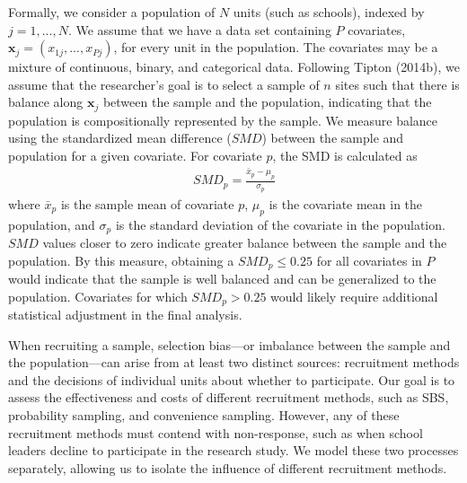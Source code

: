 \documentclass[
  english,
  man,floatsintext]{apa6}
\begin{document}
Formally, we consider a population of \(N\) units (such as schools), indexed by \(j = 1,...,N\).
We assume that we have a data set containing \(P\) covariates, \(\mathbf{x}_j = \left(x_{1j},...,x_{Pj}\right)\), for every unit in the population. The covariates may be a mixture of continuous, binary, and categorical data.
Following Tipton (2014b), we assume that the researcher's goal is to select a sample of \(n\) sites such that there is balance along \(\mathbf{x}_j\) between the sample and the population, indicating that the population is compositionally represented by the sample.
We measure balance using the standardized mean difference (\(SMD\)) between the sample and population for a given covariate. For covariate \(p\), the SMD is calculated as
\begin{align} \label{eq:SMD}
SMD_p = \frac{\bar{x}_p - \mu_p}{\sigma_p}
\end{align}
where \(\bar{x}_p\) is the sample mean of covariate \(p\), \(\mu_p\) is the covariate mean in the population, and \(\sigma_p\) is the standard deviation of the covariate in the population. \(SMD\) values closer to zero indicate greater balance between the sample and the population. By this measure, obtaining a \(SMD_p \le 0.25\) for all covariates in \(P\) would indicate that the sample is well balanced and can be generalized to the population. Covariates for which \(SMD_p > 0.25\) would likely require additional statistical adjustment in the final analysis.

When recruiting a sample, selection bias---or imbalance between the sample and the population---can arise from at least two distinct sources: recruitment methods and the decisions of individual units about whether to participate. Our goal is to assess the effectiveness and costs of different recruitment methods, such as SBS, probability sampling, and convenience sampling. However, any of these recruitment methods must contend with non-response, such as when school leaders decline to participate in the research study.
We model these two processes separately, allowing us to isolate the influence of different recruitment methods.
\end{document}
